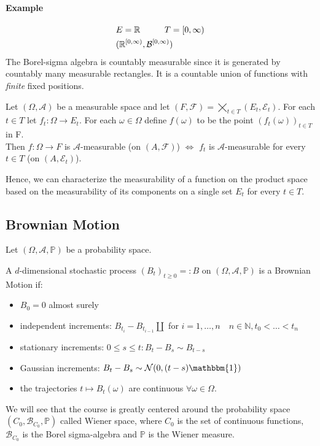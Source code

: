 \paragraph{Example} \begin{equation*}
    \begin{split}
        &E=\mathbb{R} \hspace{1 cm} T=[0,\infty)\\
        &(\mathbb{R}^{[0, \infty)}, \mathcal{B}^{[0, \infty)})
    \end{split}
\end{equation*}
The Borel-sigma algebra is countably measurable since it is generated by countably many measurable rectangles. It is a countable union of functions with \emph{finite} fixed positions. 
\begin{PropBox}
    \begin{Proposition}
    Let $(\Omega, \mathcal{A})$ be a measurable space and let $(F,\mathcal{F}) = \bigtimes _{t \in T} (E_t, \mathcal{E}_t)$. For each $t\in T$ let $f_t: \Omega \to E_t$. For each $\omega \in \Omega$ define $f(\omega)$ to be the point $(f_t(\omega))_{t \in T}$ in F. \\
    Then $f: \Omega \to F$ is $\mathcal{A}$-measurable (on $(A, \mathcal{F})$) $\iff$ $f_t$ is $\mathcal{A}$-measurable for every $t \in T$ (on $(A, \mathcal{E}_t)$).
\end{Proposition}
\end{PropBox}
Hence, we can characterize the measurability of a function on the product space based on the measurability of its components on a single set $E_t$ for every $t \in T$. 
\subsection{Brownian Motion}
Let $(\Omega, \mathcal{A}, \mathbb{P})$ be a probability space. 
\begin{DefBox}
    \begin{Def}
    A $d$-dimensional stochastic process $(B_t)_{t \geq 0} = : B$ on $(\Omega, \mathcal{A}, \mathbb{P})$ is a Brownian Motion if:
    \begin{itemize}
        \item $B_0 = 0$ almost surely 
        \item independent increments: $B_{t_i} - B_{t_{i-1}} \coprod$ for $i = 1, \ldots, n \quad n \in \mathbb{N}, t_0 < \ldots < t_n$
        \item stationary increments: $0 \leq s \leq t: B_t - B_s \sim B_{t-s}$
        \item Gaussian increments: $B_t - B_s \sim \mathcal{N}(0, (t-s) \mathbbm{1})$
        \item the trajectories $t \mapsto B_t(\omega)$ are continuous $\forall \omega \in \Omega$. 
    \end{itemize}
\end{Def}
\end{DefBox}
We will see that the course is greatly centered around the probability space $(C_0, \mathcal{B}_{C_0}, \mathbb{P})$ called Wiener space, where $C_0$ is the set of continuous functions, $\mathcal{B}_{C_0}$ is the Borel sigma-algebra and $\mathbb{P}$ is the Wiener measure.

